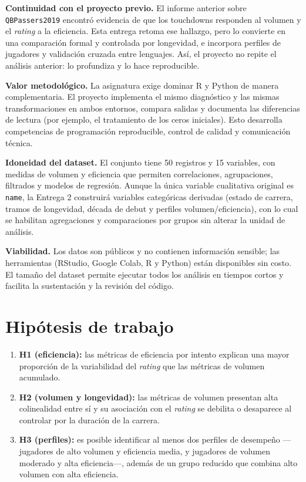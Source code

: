 \documentclass[11pt,a4paper]{article}
\begin{document}
\textbf{Continuidad con el proyecto previo.} El informe anterior sobre \texttt{QBPassers2019} encontró evidencia de que los touchdowns responden al volumen y el \textit{rating} a la eficiencia. Esta entrega retoma ese hallazgo, pero lo convierte en una comparación formal y controlada por longevidad, e incorpora perfiles de jugadores y validación cruzada entre lenguajes. Así, el proyecto no repite el análisis anterior: lo profundiza y lo hace reproducible.

\textbf{Valor metodológico.} La asignatura exige dominar R y Python de manera complementaria. El proyecto implementa el mismo diagnóstico y las mismas transformaciones en ambos entornos, compara salidas y documenta las diferencias de lectura (por ejemplo, el tratamiento de los ceros iniciales). Esto desarrolla competencias de programación reproducible, control de calidad y comunicación técnica.

\textbf{Idoneidad del dataset.} El conjunto tiene 50 registros y 15 variables, con medidas de volumen y eficiencia que permiten correlaciones, agrupaciones, filtrados y modelos de regresión. Aunque la única variable cualitativa original es \texttt{name}, la Entrega 2 construirá variables categóricas derivadas (estado de carrera, tramos de longevidad, década de debut y perfiles volumen/eficiencia), con lo cual se habilitan agregaciones y comparaciones por grupos sin alterar la unidad de análisis.

\textbf{Viabilidad.} Los datos son públicos y no contienen información sensible; las herramientas (RStudio, Google Colab, R y Python) están disponibles sin costo. El tamaño del dataset permite ejecutar todos los análisis en tiempos cortos y facilita la sustentación y la revisión del código.

\section{Hipótesis de trabajo}
\begin{enumerate}
  \item \textbf{H1 (eficiencia):} las métricas de eficiencia por intento explican una mayor proporción de la variabilidad del \textit{rating} que las métricas de volumen acumulado.
  \item \textbf{H2 (volumen y longevidad):} las métricas de volumen presentan alta colinealidad entre sí y su asociación con el \textit{rating} se debilita o desaparece al controlar por la duración de la carrera.
  \item \textbf{H3 (perfiles):} es posible identificar al menos dos perfiles de desempeño —jugadores de alto volumen y eficiencia media, y jugadores de volumen moderado y alta eficiencia—, además de un grupo reducido que combina alto volumen con alta eficiencia.
\end{enumerate}
\end{document}
